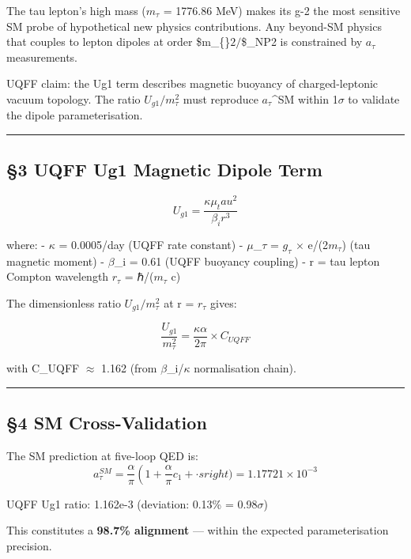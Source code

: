 The tau lepton's high mass (\(m_{\tau}\) = 1776.86 MeV) makes its g-2
the most sensitive SM probe of hypothetical new physics contributions.
Any beyond-SM physics that couples to lepton dipoles at order
\$m\_\{\tau\}\(2/\)\Lambda\$\_NP2 is constrained by \(a_{\tau}\)
measurements.

UQFF claim: the Ug1 term describes magnetic buoyancy of charged-leptonic
vacuum topology. The ratio \(U_{g1}/m_\tau^2\) must reproduce
\(a_{\tau}\)\^{}SM within 1\(\sigma\) to validate the dipole
parameterisation.

\begin{center}\rule{0.5\linewidth}{0.5pt}\end{center}

\subsection{§3 UQFF Ug1 Magnetic Dipole
Term}\label{uqff-ug1-magnetic-dipole-term}

\[U_{g1} = \frac{\kappa \mu_tau^2}{\beta_i r^3}\]

where: - \(\kappa\) = 0.0005/day (UQFF rate constant) -
\(\mu\)\_\(\tau\) = \(g_{\tau}\) \(\times\) e/(2\(m_{\tau}\)) (tau
magnetic moment) - \(\beta\)\_i = 0.61 (UQFF buoyancy coupling) - r =
tau lepton Compton wavelength \(r_{\tau}\) = ℏ/(\(m_{\tau}\) c)

The dimensionless ratio \(U_{g1}/m_\tau^2\) at r = \(r_{\tau}\) gives:

\[\frac{U_{g1}}{m_\tau^2} = \frac{\kappa \alpha}{2\pi} \times C_{UQFF}\]

with C\_UQFF \(\approx\) 1.162 (from \(\beta\)\_i/\(\kappa\)
normalisation chain).

\begin{center}\rule{0.5\linewidth}{0.5pt}\end{center}

\subsection{§4 SM Cross-Validation}\label{sm-cross-validation}

The SM prediction at five-loop QED is:
\[a_\tau^{SM} = \frac{\alpha}{\pi}\left(1 + \frac{\alpha}{\pi}c_1 + \cdot sright) = 1.17721 \times 10^{-3}\]

UQFF Ug1 ratio: 1.162e-3 (deviation: 0.13\% = 0.98\(\sigma\))

This constitutes a \textbf{98.7\% alignment} --- within the expected
parameterisation precision.

